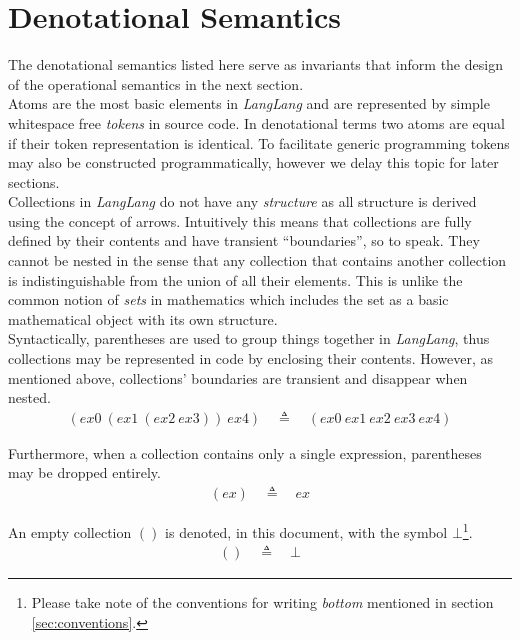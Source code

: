 \documentclass[a4paper,11pt]{article}
\begin{document}
\section{Denotational Semantics}

The denotational semantics listed here serve as invariants that inform the design of the operational semantics in the next section.\\

Atoms are the most basic elements in \textsl{LangLang} and are represented by simple whitespace free \emph{tokens} in source code.
In denotational terms two atoms are equal if their token representation is identical.
To facilitate generic programming tokens may also be constructed programmatically, however we delay this topic for later sections.\\

Collections in \textsl{LangLang} do not have any \emph{structure} as all structure is derived using the concept of arrows.
Intuitively this means that collections are fully defined by their contents and have transient ``boundaries'', so to speak.
They cannot be nested in the sense that any collection that contains another collection is indistinguishable from the union of all their elements.
This is unlike the common notion of \emph{sets} in mathematics which includes the set as a basic mathematical object with its own structure.\\

Syntactically, parentheses are used to group things together in \textsl{LangLang}, thus collections may be represented in code by enclosing their contents.
However, as mentioned above, collections' boundaries are transient and disappear when nested.
\begin{eqnarray}
(ex0\ (ex1\ (ex2\ ex3))\ ex4) \quad\triangleq\quad (ex0\ ex1\ ex2\ ex3\ ex4)
\end  {eqnarray}

Furthermore, when a collection contains only a single expression, parentheses may be dropped entirely.
\begin{eqnarray}
(ex) \quad\triangleq\quad ex
\end  {eqnarray}

An empty collection $()$ is denoted, in this document, with the symbol $\bot$\footnote{Please take note of the conventions for writing \emph{bottom} mentioned in section \ref{sec:conventions}.}.
\begin{eqnarray}
() \quad\triangleq\quad \bot
\end{eqnarray}
\end{document}
